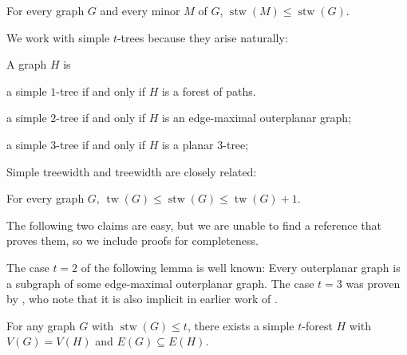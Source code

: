 \documentclass[kpfonts]{patmorin}
\DeclareMathOperator{\tw}{tw}
\DeclareMathOperator{\stw}{stw}
\theoremstyle{named}
\begin{document}
\begin{lem}\label{simple-minor-closed}
    For every graph $G$ and every minor $M$ of $G$, $\stw(M)\le\stw(G)$.
\end{lem}

We work with simple $t$-trees because they arise naturally:

\begin{lem}\label{simple-small-cases}
    A graph $H$ is
    \begin{compactenum}[(i)]
        \item a simple $1$-tree if and only if $H$ is a forest of paths.
        \item a simple $2$-tree if and only if $H$ is an edge-maximal outerplanar graph;
        \item a simple $3$-tree if and only if $H$ is a planar 3-tree;
    \end{compactenum}
\end{lem}

Simple treewidth and treewidth are closely related:

\begin{lem}\label{simple-treewidth-vs-treewidth}\cite{knauer.ueckerdt:simple}
    For every graph $G$, $\tw(G)\le \stw(G)\le \tw(G)+1$.
\end{lem}

The following two claims are easy, but we are unable to find a reference that proves them, so we include proofs for completeness.

The case $t=2$ of the following lemma is well known: Every outerplanar graph is a subgraph of some edge-maximal outerplanar graph.  The case $t=3$ was proven by \citet{kratochvil.vaner:note}, who note that it is also implicit in earlier work of \citet{elmallah.colbourn:on}.

\begin{clm}\label{simple-subgraph}
    For any graph $G$ with $\stw(G)\le t$, there exists a simple $t$-forest $H$ with $V(G)= V(H)$ and $E(G)\subseteq E(H)$.
\end{clm}
\end{document}
